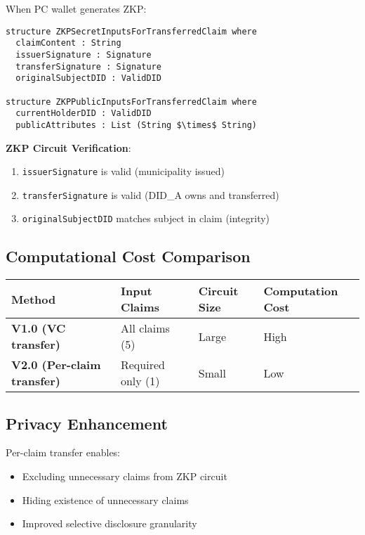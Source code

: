 When PC wallet generates ZKP:

\begin{verbatim}
structure ZKPSecretInputsForTransferredClaim where
  claimContent : String
  issuerSignature : Signature
  transferSignature : Signature
  originalSubjectDID : ValidDID

structure ZKPPublicInputsForTransferredClaim where
  currentHolderDID : ValidDID
  publicAttributes : List (String $\times$ String)
\end{verbatim}

\textbf{ZKP Circuit Verification}:
\begin{enumerate}
  \item \texttt{issuerSignature} is valid (municipality issued)
  \item \texttt{transferSignature} is valid (DID\_A owns and transferred)
  \item \texttt{originalSubjectDID} matches subject in claim (integrity)
\end{enumerate}

\subsection{Computational Cost Comparison}

\begin{table}[H]
\centering
\begin{tabular}{|l|l|l|l|}
\hline
\textbf{Method} & \textbf{Input Claims} & \textbf{Circuit Size} & \textbf{Computation Cost} \\
\hline
\textbf{V1.0 (VC transfer)} & All claims (5) & Large & High \\
\hline
\textbf{V2.0 (Per-claim transfer)} & Required only (1) & Small & Low \\
\hline
\end{tabular}
\end{table}

\subsection{Privacy Enhancement}

Per-claim transfer enables:
\begin{itemize}
  \item Excluding unnecessary claims from ZKP circuit
  \item Hiding existence of unnecessary claims
  \item Improved selective disclosure granularity
\end{itemize}

